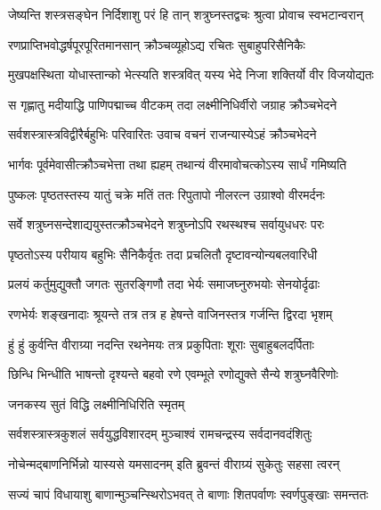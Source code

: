 \twolineshloka
{जेष्यन्ति शस्त्रसङ्घेन निर्दिशाशु परं हि तान्}
{शत्रुघ्नस्तद्वचः श्रुत्वा प्रोवाच स्वभटान्वरान्}%

\twolineshloka
{रणप्राप्तिभवोद्धर्षपूरपूरितमानसान्}
{क्रौञ्चव्यूहोऽद्य रचितः सुबाहुपरिसैनिकैः}%

\twolineshloka
{मुखपक्षस्थिता योधास्तान्को भेत्स्यति शस्त्रवित्}
{यस्य भेदे निजा शक्तिर्यो वीर विजयोद्यतः}%

\twolineshloka
{स गृह्णातु मदीयाद्धि पाणिपद्माच्च वीटकम्}
{तदा लक्ष्मीनिधिर्वीरो जग्राह क्रौञ्चभेदने}%

\twolineshloka
{सर्वशस्त्रास्त्रविद्वीरैर्बहुभिः परिवारितः}
{उवाच वचनं राजन्यास्येऽहं क्रौञ्चभेदने}%

\twolineshloka
{भार्गवः पूर्वमेवासीत्क्रौञ्चभेत्ता तथा ह्यहम्}
{तथान्यं वीरमावोचत्कोऽस्य सार्धं गमिष्यति}%

\twolineshloka
{पुष्कलः पृष्ठतस्तस्य यातुं चक्रे मतिं ततः}
{रिपुतापो नीलरत्न उग्राश्वो वीरमर्दनः}%

\twolineshloka
{सर्वे शत्रुघ्नसन्देशाद्ययुस्तत्क्रौञ्चभेदने}
{शत्रुघ्नोऽपि रथस्थश्च सर्वायुधधरः परः}%

\twolineshloka
{पृष्ठतोऽस्य परीयाय बहुभिः सैनिकैर्वृतः}
{तदा प्रचलितौ दृष्टावन्योन्यबलवारिधी}%

\twolineshloka
{प्रलयं कर्तुमुद्युक्तौ जगतः सुतरङ्गिणौ}
{तदा भेर्यः समाजघ्नुरुभयोः सेनयोर्दृढाः}%

\twolineshloka
{रणभेर्यः शङ्खनादाः श्रूयन्ते तत्र तत्र ह}
{हेषन्ते वाजिनस्तत्र गर्जन्ति द्विरदा भृशम्}%

\twolineshloka
{हुं हुं कुर्वन्ति वीराग्र्या नदन्ति रथनेमयः}
{तत्र प्रकुपिताः शूराः सुबाहुबलदर्पिताः}%

\twolineshloka
{छिन्धि भिन्धीति भाषन्तो दृश्यन्ते बहवो रणे}
{एवम्भूते रणोद्युक्ते सैन्ये शत्रुघ्नवैरिणोः}%



\onelineshloka
{जनकस्य सुतं विद्धि लक्ष्मीनिधिरिति स्मृतम्}%

\twolineshloka
{सर्वशस्त्रास्त्रकुशलं सर्वयुद्धविशारदम्}
{मुञ्चाश्वं रामचन्द्रस्य सर्वदानवदंशितुः}%

\twolineshloka
{नोचेन्मद्बाणनिर्भिन्नो यास्यसे यमसादनम्}
{इति ब्रुवन्तं वीराग्र्यं सुकेतुः सहसा त्वरन्}%

\twolineshloka
{सज्यं चापं विधायाशु बाणान्मुञ्चन्स्थिरोऽभवत्}
{ते बाणाः शितपर्वाणः स्वर्णपुङ्खाः समन्ततः}%

